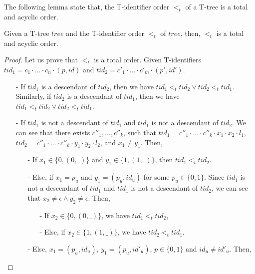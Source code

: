 The following lemma state that, the T-identifier order $<_t$ of a T-tree is a total and acyclic order.

\begin{lemma}
\label{lemma:the <t order is a total and acyclic order}
Given a T-tree $tree$ and the T-identifier order $<_t$ of $tree$, then, $<_t$ is a total and acyclic order.
\end{lemma}

\begin {proof}
Let us prove that $<_t$ is a total order. Given T-identifiers $tid_1 = c_1 \cdot \ldots \cdot c_n \cdot (p,id)$ and $tid_2 = c'_1 \cdot \ldots \cdot c'_m \cdot (p',id')$.

\begin{itemize}
\setlength{\itemsep}{0.5pt}
\item[-] If $tid_1$ is a descendant of $tid_2$, then we have $tid_1 <_t tid_2 \vee tid_2 <_t tid_1$. Similarly, if $tid_2$ is a descendant of $tid_1$, then we have $tid_1 <_t tid_2 \vee tid_2 <_t tid_1$.

\item[-] If $tid_1$ is not a descendant of $tid_1$ and $tid_1$ is not a descendant of $tid_2$. We can see that there exists $c''_1,\ldots,c''_k$, such that $tid_1 = c''_1 \cdot \ldots \cdot c''_k \cdot x_1 \cdot x_2 \cdot l_1$, $tid_2 = c''_1 \cdot \ldots \cdot c''_k \cdot y_1 \cdot y_2 \cdot l_2$, and $x_1 \neq y_1$. Then,

    \begin{itemize}
    \setlength{\itemsep}{0.5pt}
    \item[-] If $x_1 \in \{ 0, (0,\_) \}$ and $y_1 \in \{ 1, (1,\_) \}$, then $tid_1 <_t tid_2$.

    \item[-] Else, if $x_1=p_u$ and $y_1 = (p_u,id_u)$ for some $p_u \in \{ 0,1 \}$. Since $tid_1$ is not a descendant of $tid_1$ and $tid_1$ is not a descendant of $tid_2$, we can see that $x_2 \neq \epsilon \wedge y_2 \neq \epsilon$. Then,

        \begin{itemize}
        \setlength{\itemsep}{0.5pt}
        \item[-] If $x_2 \in \{ 0, (0,\_) \}$, we have $tid_1 <_t tid_2$,
        \item[-] Else, if $x_2 \in \{ 1, (1,\_) \}$, we have $tid_2 <_t tid_1$.
        \end{itemize}

    \item[-] Else, $x_1 = (p_u,id_u)$, $y_1 = (p_u,id'_u)$, $p \in \{0,1 \}$ and $id_u \neq id'_u$. Then,


\end{itemize}
\end{itemize}
\end{proof}
